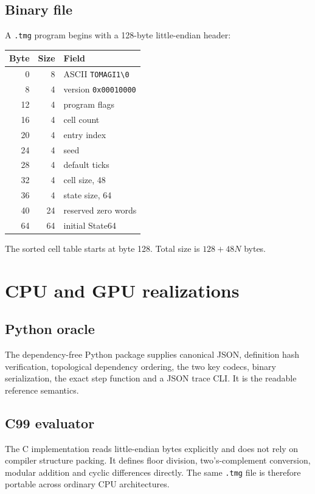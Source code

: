 \documentclass[11pt,a4paper]{article}
\newcommand{\code}[1]{\texttt{#1}}
\begin{document}


\subsection{Binary file}
A \code{.tmg} program begins with a 128-byte little-endian header:
\begin{center}
\begin{tabular}{@{}rrl@{}}
\toprule
Byte & Size & Field\\
\midrule
0 & 8 & ASCII \code{TOMAGI1\textbackslash0}\\
8 & 4 & version \code{0x00010000}\\
12 & 4 & program flags\\
16 & 4 & cell count\\
20 & 4 & entry index\\
24 & 4 & seed\\
28 & 4 & default ticks\\
32 & 4 & cell size, 48\\
36 & 4 & state size, 64\\
40 & 24 & reserved zero words\\
64 & 64 & initial State64\\
\bottomrule
\end{tabular}
\end{center}
The sorted cell table starts at byte 128. Total size is $128+48N$ bytes.




\section{CPU and GPU realizations}

\subsection{Python oracle}
The dependency-free Python package supplies canonical JSON, definition hash verification, topological dependency ordering, the two key codecs, binary serialization, the exact step function and a JSON trace CLI. It is the readable reference semantics.

\subsection{C99 evaluator}
The C implementation reads little-endian bytes explicitly and does not rely on compiler structure packing. It defines floor division, two's-complement conversion, modular addition and cyclic differences directly. The same \code{.tmg} file is therefore portable across ordinary CPU architectures.
\end{document}
